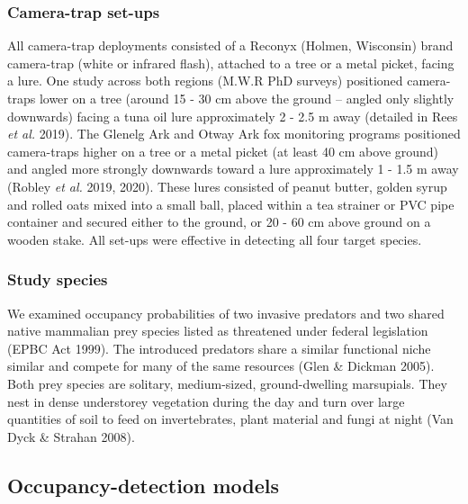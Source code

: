 \documentclass[11pt,a4paper,titlepage,twoside,openright]{style/unimelbthesis}
\begin{document}
\begin{mainmatter}
\hypertarget{camera-trap-set-ups}{%
\subsubsection{Camera-trap set-ups}\label{camera-trap-set-ups}}

All camera-trap deployments consisted of a Reconyx (Holmen, Wisconsin) brand camera-trap (white or infrared flash), attached to a tree or a metal picket, facing a lure. One study across both regions (M.W.R PhD surveys) positioned camera-traps lower on a tree (around 15 - 30 cm above the ground -- angled only slightly downwards) facing a tuna oil lure approximately 2 - 2.5 m away (detailed in Rees \emph{et al.} 2019). The Glenelg Ark and Otway Ark fox monitoring programs positioned camera-traps higher on a tree or a metal picket (at least 40 cm above ground) and angled more strongly downwards toward a lure approximately 1 - 1.5 m away (Robley \emph{et al.} 2019, 2020). These lures consisted of peanut butter, golden syrup and rolled oats mixed into a small ball, placed within a tea strainer or PVC pipe container and secured either to the ground, or 20 - 60 cm above ground on a wooden stake. All set-ups were effective in detecting all four target species.

\hypertarget{study-species-1}{%
\subsubsection{Study species}\label{study-species-1}}

We examined occupancy probabilities of two invasive predators and two shared native mammalian prey species listed as threatened under federal legislation (EPBC Act 1999). The introduced predators share a similar functional niche similar and compete for many of the same resources (Glen \& Dickman 2005). Both prey species are solitary, medium-sized, ground-dwelling marsupials. They nest in dense understorey vegetation during the day and turn over large quantities of soil to feed on invertebrates, plant material and fungi at night (Van Dyck \& Strahan 2008).

\hypertarget{occupancy-detection-models}{%
\subsection{Occupancy-detection models}\label{occupancy-detection-models}}


\end{mainmatter}
\end{document}
